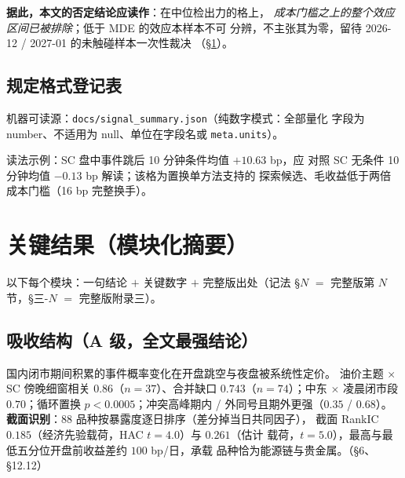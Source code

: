 \documentclass[11pt, a4paper]{ctexart}
\newcommand{\code}[1]{\texttt{\small #1}}
\begin{document}
\noindent\textbf{据此，本文的否定结论应读作}：在中位检出力的格上，
\emph{成本门槛之上的整个效应区间已被排除}；低于 MDE 的效应本样本不可
分辨，不主张其为零，留待 2026-12 / 2027-01 的未触碰样本一次性裁决
（§\ref{sec:results}）。

\subsection{规定格式登记表}

机器可读源：\code{docs/signal\_summary.json}（纯数字模式：全部量化
字段为 number、不适用为 null、单位在字段名或 \code{meta.units}）。

\begin{table}[h!]\centering\scriptsize
\caption{登记信号主表（IC / ICIR / 取 1 收益 / 符号 IC，均为 1/3/10
分钟三元组）}
\resizebox{\textwidth}{!}{}
\end{table}

\begin{table}[h!]\centering\footnotesize
\caption{取值统计量（连续：矩统计；离散：valuecount）与非零频率}

\end{table}

\begin{table}[h!]\centering\footnotesize
\caption{品种全区间基准（离散信号条件均值的对照；剔换月日）}

\end{table}

\noindent 读法示例：SC 盘中事件跳后 10 分钟条件均值 $+10.63$ bp，应
对照 SC 无条件 10 分钟均值 $-0.13$ bp 解读；该格为置换单方法支持的
探索候选、毛收益低于两倍成本门槛（16 bp 完整换手）。

\section{关键结果（模块化摘要）}\label{sec:results}

以下每个模块：一句结论 $+$ 关键数字 $+$ 完整版出处（记法 §$N$ $=$
完整版第 $N$ 节，§三-$N$ $=$ 完整版附录三）。

\subsection{吸收结构（A 级，全文最强结论）}

国内闭市期间积累的事件概率变化在开盘跳空与夜盘被系统性定价。
油价主题 $\times$ SC 傍晚细窗相关 $0.86$（$n=37$）、合并缺口
$0.743$（$n=74$）；中东 $\times$ 凌晨闭市段 $0.70$；循环置换
$p<0.0005$；冲突高峰期内 / 外同号且期外更强（$0.35$ / $0.68$）。
\textbf{截面识别}：88 品种按暴露度逐日排序（差分掉当日共同因子），
截面 RankIC $0.185$（经济先验载荷，HAC $t=4.0$）与 $0.261$（估计
载荷，$t=5.0$），最高与最低五分位开盘前收益差约 $100$ bp/日，承载
品种恰为能源链与贵金属。（§6、§12.12）
\end{document}
